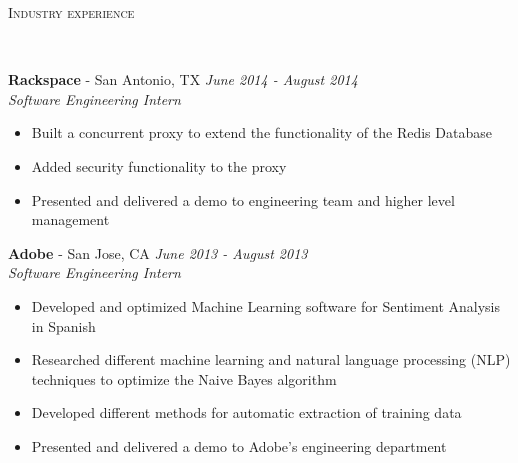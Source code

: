 \documentclass{article}
\newenvironment{changemargin}[2]{%
  \begin{list}{}{%
    \setlength{\topsep}{0pt}%
    \setlength{\leftmargin}{#1}%
    \setlength{\rightmargin}{#2}%
    \setlength{\listparindent}{\parindent}%
    \setlength{\itemindent}{\parindent}%
    \setlength{\parsep}{\parskip}%
  }%
  \item[]}{\end{list}
}
\newcommand{\lineover}{
	\begin{changemargin}{-0.05in}{-0.05in}
		\vspace*{-8pt}
		\hrulefill \\
		\vspace*{-2pt}
	\end{changemargin}
}
\newcommand{\header}[1]{
	\begin{changemargin}{-0.5in}{-0.5in}
		\scshape{#1}\\
  	\lineover
	\end{changemargin}
}
\newenvironment{body} {
	\vspace*{-16pt}
	\begin{changemargin}{-0.25in}{-0.5in}
  }	
	{\end{changemargin}
}
\begin{document}

\header{Industry experience}
\begin{body}
	\vspace{16pt}
    \textbf{Rackspace} - San Antonio, TX \hfill \emph{June 2014 - August 2014}\\
	\emph{Software Engineering Intern}\\
	\vspace*{-3pt}
	\begin{itemize} \itemsep -2pt
		\item Built a concurrent proxy to extend the functionality of the Redis Database
        \item Added security functionality to the proxy
        \item Presented and delivered a demo to engineering team and higher level management
	\end{itemize}
   
   	\textbf{Adobe} - San Jose, CA \hfill \emph{June 2013 - August 2013}\\
	\emph{Software Engineering Intern}\\
	\vspace*{-3pt}
	\begin{itemize} \itemsep -2pt
		\item Developed and optimized Machine Learning software for Sentiment Analysis in Spanish
        \item Researched different machine learning and natural language processing (NLP) techniques to optimize the Naive Bayes algorithm
        \item Developed different methods for automatic extraction of training data
        \item Presented and delivered a demo to Adobe's engineering department
	\end{itemize}

\end{body}

\newpage
\end{document}

